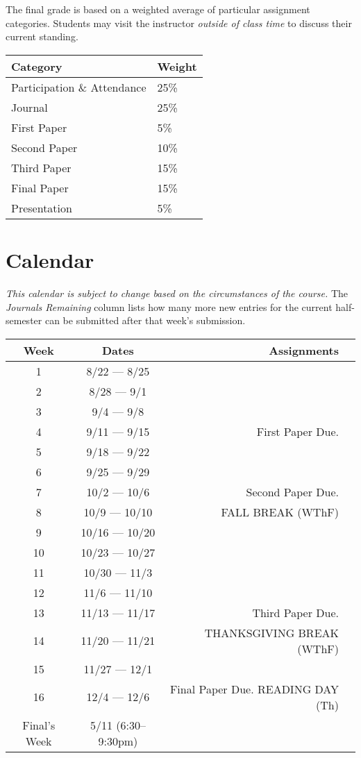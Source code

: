 \documentclass[nobib]{tufte-handout}
\begin{document}
The final grade is based on a weighted average of particular assignment categories.  Students may visit the instructor \textit{outside of class time} to discuss their current standing.

\begin{center}
\begin{tabular}{ll}
Category & Weight  \\ \hline
Participation \& Attendance & 25\% \\
Journal & 25\% \\
First Paper & 5\% \\
Second Paper & 10\% \\
Third Paper & 15\% \\
Final Paper & 15\% \\
Presentation & 5\% \\
\end{tabular}
\end{center}


\section{Calendar}

\textit{This calendar is subject to change based on the circumstances of the course.}  The \textit{Journals Remaining} column lists how many more new entries for the current half-semester can be submitted after that week's submission.

\begin{center}
\begin{tabular}{|c|c|r|c|}
\hline
Week & Dates & Assignments \\
\hline
1 & 8/22 --- 8/25 &  \\
\hline
2 & 8/28 --- 9/1 &  \\
\hline
3 & 9/4 --- 9/8 &  \\
\hline
4 & 9/11 --- 9/15 & First Paper Due. \\
\hline
5 & 9/18 --- 9/22 &  \\
\hline
6 & 9/25 --- 9/29 &  \\
\hline
7 & 10/2 --- 10/6 &  Second Paper Due.  \\
\hline
8 & 10/9 --- 10/10 &  FALL BREAK (WThF)\\
\hline
9 & 10/16 --- 10/20 &  \\
\hline
10 & 10/23 --- 10/27 &  \\
\hline
11 & 10/30 --- 11/3 &  \\
\hline
12 & 11/6 --- 11/10 &  \\
\hline
13 & 11/13 --- 11/17 &  Third Paper Due. \\
\hline
14 & 11/20 --- 11/21 &  THANKSGIVING BREAK (WThF) \\
\hline
15 & 11/27 --- 12/1 &  \\
\hline
16 & 12/4 --- 12/6 & Final Paper Due. READING DAY (Th) \\
\hline
Final's Week & 5/11 (6:30--9:30pm) &  \\
\hline
\end{tabular}
\end{center}
\end{document}

